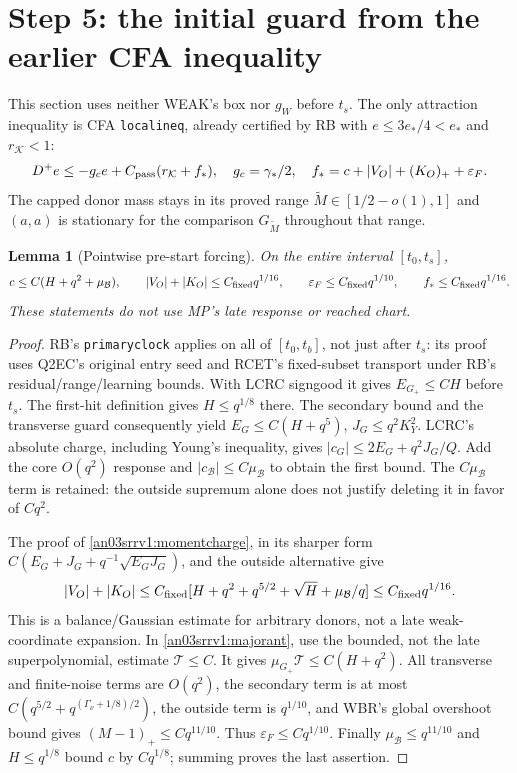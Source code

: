 \documentclass[11pt]{article}
\numberwithin{equation}{section}
\newtheorem{lemma}[theorem]{Lemma}\newtheorem{proposition}[theorem]{Proposition}
\theoremstyle{remark}\newtheorem{remark}[theorem]{Remark}
\newcommand{\KK}{\mathcal K}\newcommand{\BB}{\mathcal B}
\newcommand{\Gp}{{G_+}}\newcommand{\eps}{\varepsilon}
\begin{document}
\section{Step 5: the initial guard from the earlier CFA inequality}
\label{an03srrv1:entrysection}
This section uses neither WEAK's box nor $g_W$ before $t_s$.
The only attraction inequality is CFA \texttt{localineq}, already
certified by RB with $e\le3e_*/4<e_*$ and $r_\KK<1$:
\begin{equation}
 D^+e\le-g_c e+C_{\rm pass}(r_\KK+f_*),\quad
 g_c=\gamma_*/2,\quad
 f_*=c+|V_O|+(K_O)_++\eps_F.
 \label{an03srrv1:earlier}
\end{equation}
The capped donor mass stays in its proved range
$\widetilde M\in[1/2-o(1),1]$ and $(a,a)$ is stationary for
the comparison $G_{\widetilde M}$ throughout that range.

\begin{lemma}[Pointwise pre-start forcing]
\label{an03srrv1:preforcing}
On the entire interval $[t_0,t_s]$,
\begin{equation}
 c\le C(H+q^2+\mu_\BB),\qquad
 |V_O|+|K_O|\le C_{\rm fixed}q^{1/16},\qquad
 \eps_F\le C_{\rm fixed}q^{1/10},\qquad
 f_*\le C_{\rm fixed}q^{1/16}.
 \label{an03srrv1:prebounds}
\end{equation}
These statements do not use MP's late response or reached chart.
\end{lemma}
\begin{proof}
RB's \texttt{primaryclock} applies on all of $[t_0,t_b]$, not just
after $t_s$: its proof uses Q2EC's original entry seed and RCET's
fixed-subset transport under RB's residual/range/learning bounds.
With LCRC signgood it gives $E_\Gp\le CH$ before $t_s$.
The first-hit definition gives $H\le q^{1/8}$ there.
The secondary bound and the transverse guard consequently yield
$E_G\le C(H+q^5)$, $J_G\le q^2K_Y^2$.
LCRC's absolute charge, including Young's inequality, gives
$|c_G|\le2E_G+q^2J_G/Q$. Add the core $O(q^2)$ response and
$|c_\BB|\le C\mu_\BB$ to obtain the first bound.
The $C\mu_\BB$ term is retained: the outside supremum alone
does not justify deleting it in favor of $Cq^2$.

The proof of \eqref{an03srrv1:momentcharge}, in its sharper form
$C(E_G+J_G+q^{-1}\sqrt{E_GJ_G})$, and the outside alternative give
\[
 |V_O|+|K_O|\le C_{\rm fixed}
  [H+q^2+q^{5/2}+\sqrt H+\mu_\BB/q]
                  \le C_{\rm fixed}q^{1/16}.
\]
This is a balance/Gaussian estimate for arbitrary donors, not a late
weak-coordinate expansion. In \eqref{an03srrv1:majorant}, use
the bounded, not the late superpolynomial, estimate $\mathcal T\le C$.
It gives $\mu_\Gp\mathcal T\le C(H+q^2)$.
All transverse and finite-noise terms are $O(q^2)$, the secondary
term is at most
$C(q^{5/2}+q^{(\Gamma_\nu+1/8)/2})$, the outside term is
$q^{1/10}$, and WBR's global overshoot bound gives
$(M-1)_+\le Cq^{11/10}$. Thus $\eps_F\le Cq^{1/10}$.
Finally $\mu_\BB\le q^{11/10}$ and $H\le q^{1/8}$ bound
$c$ by $Cq^{1/8}$; summing proves the last assertion.
\end{proof}
\end{document}

